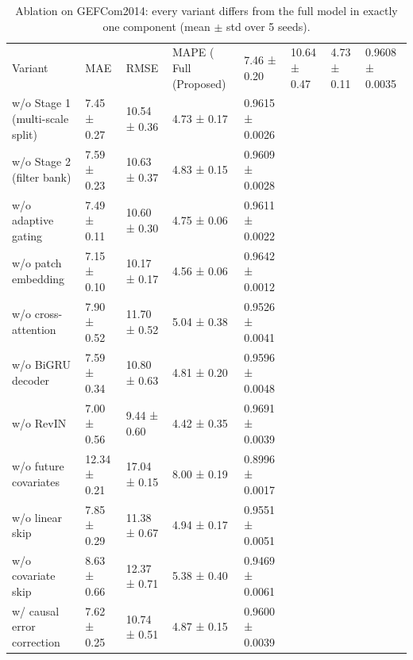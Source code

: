 \begin{table}
\caption{Ablation on GEFCom2014: every variant differs from the full model in exactly one component (mean $\pm$ std over 5 seeds).}
\label{tab:ablation}
\begin{tabular}{lllll}
\toprule
Variant & MAE & RMSE & MAPE (%
\midrule
Full (Proposed) & 7.46 ± 0.20 & 10.64 ± 0.47 & 4.73 ± 0.11 & 0.9608 ± 0.0035 \\
w/o Stage 1 (multi-scale split) & 7.45 ± 0.27 & 10.54 ± 0.36 & 4.73 ± 0.17 & 0.9615 ± 0.0026 \\
w/o Stage 2 (filter bank) & 7.59 ± 0.23 & 10.63 ± 0.37 & 4.83 ± 0.15 & 0.9609 ± 0.0028 \\
w/o adaptive gating & 7.49 ± 0.11 & 10.60 ± 0.30 & 4.75 ± 0.06 & 0.9611 ± 0.0022 \\
w/o patch embedding & 7.15 ± 0.10 & 10.17 ± 0.17 & 4.56 ± 0.06 & 0.9642 ± 0.0012 \\
w/o cross-attention & 7.90 ± 0.52 & 11.70 ± 0.52 & 5.04 ± 0.38 & 0.9526 ± 0.0041 \\
w/o BiGRU decoder & 7.59 ± 0.34 & 10.80 ± 0.63 & 4.81 ± 0.20 & 0.9596 ± 0.0048 \\
w/o RevIN & 7.00 ± 0.56 & 9.44 ± 0.60 & 4.42 ± 0.35 & 0.9691 ± 0.0039 \\
w/o future covariates & 12.34 ± 0.21 & 17.04 ± 0.15 & 8.00 ± 0.19 & 0.8996 ± 0.0017 \\
w/o linear skip & 7.85 ± 0.29 & 11.38 ± 0.67 & 4.94 ± 0.17 & 0.9551 ± 0.0051 \\
w/o covariate skip & 8.63 ± 0.66 & 12.37 ± 0.71 & 5.38 ± 0.40 & 0.9469 ± 0.0061 \\
w/ causal error correction & 7.62 ± 0.25 & 10.74 ± 0.51 & 4.87 ± 0.15 & 0.9600 ± 0.0039 \\
\bottomrule
\end{tabular}
\end{table}
